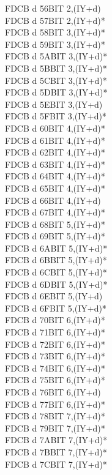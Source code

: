 \documentclass[oneside,a4paper]{book}
\begin{document}
\begin{multicols}{3}
{\begin{tabbing}
FDCB d 56\>BIT 2,(IY+d)\\
FDCB d 57\>BIT 2,(IY+d)*\\
FDCB d 58\>BIT 3,(IY+d)*\\
FDCB d 59\>BIT 3,(IY+d)*\\
FDCB d 5A\>BIT 3,(IY+d)*\\
FDCB d 5B\>BIT 3,(IY+d)*\\
FDCB d 5C\>BIT 3,(IY+d)*\\
FDCB d 5D\>BIT 3,(IY+d)*\\
FDCB d 5E\>BIT 3,(IY+d)\\
FDCB d 5F\>BIT 3,(IY+d)*\\
FDCB d 60\>BIT 4,(IY+d)*\\
FDCB d 61\>BIT 4,(IY+d)*\\
FDCB d 62\>BIT 4,(IY+d)*\\
FDCB d 63\>BIT 4,(IY+d)*\\
FDCB d 64\>BIT 4,(IY+d)*\\
FDCB d 65\>BIT 4,(IY+d)*\\
FDCB d 66\>BIT 4,(IY+d)\\
FDCB d 67\>BIT 4,(IY+d)*\\
FDCB d 68\>BIT 5,(IY+d)*\\
FDCB d 69\>BIT 5,(IY+d)*\\
FDCB d 6A\>BIT 5,(IY+d)*\\
FDCB d 6B\>BIT 5,(IY+d)*\\
FDCB d 6C\>BIT 5,(IY+d)*\\
FDCB d 6D\>BIT 5,(IY+d)*\\
FDCB d 6E\>BIT 5,(IY+d)\\
FDCB d 6F\>BIT 5,(IY+d)*\\
FDCB d 70\>BIT 6,(IY+d)*\\
FDCB d 71\>BIT 6,(IY+d)*\\
FDCB d 72\>BIT 6,(IY+d)*\\
FDCB d 73\>BIT 6,(IY+d)*\\
FDCB d 74\>BIT 6,(IY+d)*\\
FDCB d 75\>BIT 6,(IY+d)*\\
FDCB d 76\>BIT 6,(IY+d)\\
FDCB d 77\>BIT 6,(IY+d)*\\
FDCB d 78\>BIT 7,(IY+d)*\\
FDCB d 79\>BIT 7,(IY+d)*\\
FDCB d 7A\>BIT 7,(IY+d)*\\
FDCB d 7B\>BIT 7,(IY+d)*\\
FDCB d 7C\>BIT 7,(IY+d)*\\

\end{tabbing}}
\end{multicols}
\end{document}
